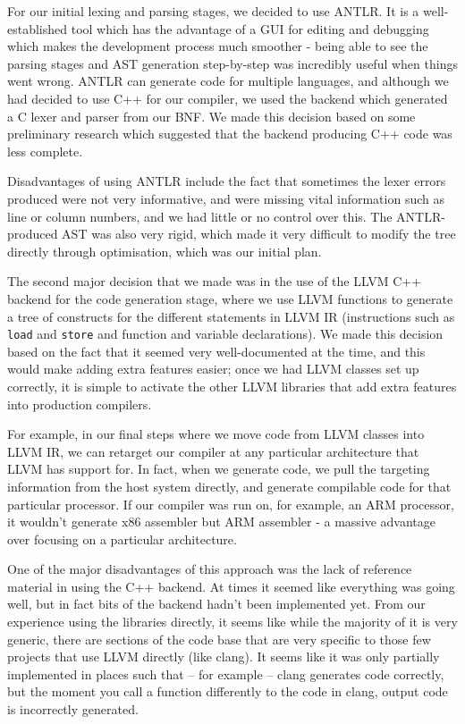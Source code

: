 \documentclass[a4wide, 11pt]{article}
\begin{document}
For our initial lexing and parsing stages, we decided to use ANTLR. It is a well-established tool which has the advantage of a GUI for editing and debugging which makes the development process much smoother - being able to see the parsing stages and AST generation step-by-step was incredibly useful when things went wrong. ANTLR can generate code for multiple languages, and although we had decided to use C++ for our compiler, we used the backend which generated a C lexer and parser from our BNF. We made this decision based on some preliminary research which suggested that the backend producing C++ code was less complete. 

Disadvantages of using ANTLR include the fact that sometimes the lexer errors produced were not very informative, and were missing vital information such as line or column numbers, and we had little or no control over this. The ANTLR-produced AST was also very rigid, which made it very difficult to modify the tree directly through optimisation, which was our initial plan.

The second major decision that we made was in the use of the LLVM C++ backend for the code generation stage, where we use LLVM functions to generate a tree of constructs for the different statements in LLVM IR (instructions such as \texttt{load} and \texttt{store} and function and variable declarations). We made this decision based on the fact that it seemed very well-documented at the time, and this would make adding extra features easier; once we had LLVM classes set up correctly, it is simple to activate the other LLVM libraries that add extra features into production compilers.

For example, in our final steps where we move code from LLVM classes into LLVM IR, we can retarget our compiler at any particular architecture that LLVM has support for. In fact, when we generate code, we pull the targeting information from the host system directly, and generate compilable code for that particular processor. If our compiler was run on, for example, an ARM processor, it wouldn't generate x86 assembler but ARM assembler - a massive advantage over focusing on a particular architecture.

One of the major disadvantages of this approach was the lack of reference material in using the C++ backend. At times it seemed like everything was going well, but in fact bits of the backend hadn't been implemented yet. From our experience using the libraries directly, it seems like while the majority of it is very generic, there are sections of the code base that are very specific to those few projects that use LLVM directly (like clang). It seems like it was only partially implemented in places such that -- for example -- clang generates code correctly, but the moment you call a function differently to the code in clang, output code is incorrectly generated.
\end{document}
